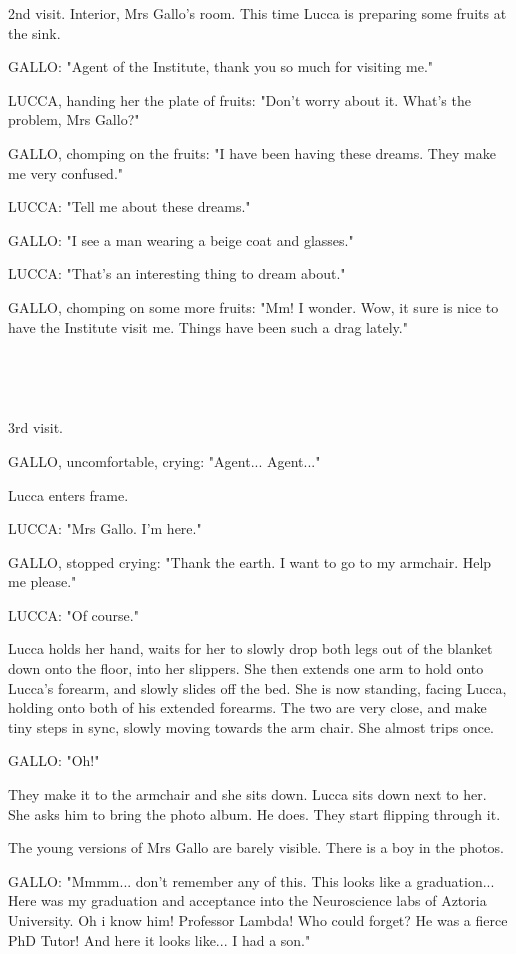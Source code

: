 \documentclass[11pt]{article}
\begin{document}
2nd visit.
Interior, Mrs Gallo's room.
This time Lucca is preparing some fruits at the sink.

GALLO: "Agent of the Institute, thank you so much for visiting me."

LUCCA, handing her the plate of fruits: "Don't worry about it.
What's the problem, Mrs Gallo?"

GALLO, chomping on the fruits: "I have been having these dreams. 
They make me very confused."

LUCCA: "Tell me about these dreams."

GALLO: "I see a man wearing a beige coat and glasses."

LUCCA: "That's an interesting thing to dream about."

GALLO, chomping on some more fruits: "Mm! I wonder.
Wow, it sure is nice to have the Institute visit me.
Things have been such a drag lately."

\ 

\ 

3rd visit.

GALLO, uncomfortable, crying: "Agent... Agent..."

Lucca enters frame.

LUCCA: "Mrs Gallo.
I'm here."

GALLO, stopped crying: "Thank the earth.
I want to go to my armchair.
Help me please."

LUCCA: "Of course."

Lucca holds her hand, waits for her to slowly drop both legs out of the blanket down onto the floor, into her slippers.
She then extends one arm to hold onto Lucca's forearm, and slowly slides off the bed.
She is now standing, facing Lucca, holding onto both of his extended forearms.
The two are very close, and make tiny steps in sync, slowly moving towards the arm chair.
She almost trips once.

GALLO: "Oh!"

They make it to the armchair and she sits down.
Lucca sits down next to her.
She asks him to bring the photo album. 
He does.
They start flipping through it.

The young versions of Mrs Gallo are barely visible.
There is a boy in the photos. 

GALLO: "Mmmm... don't remember any of this.
This looks like a graduation...
Here was my graduation and acceptance into the Neuroscience labs of Aztoria University.
Oh i know him! Professor Lambda! Who could forget? He was a fierce PhD Tutor!
And here it looks like...
I had a son."
\end{document}
